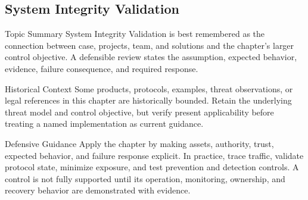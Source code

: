 \documentclass[11pt,letterpaper]{article}
\begin{document}
\subsection*{System Integrity Validation}
\begin{CornellNotesTable}
\end{CornellNotesTable}
\begin{CornellSummaryBox}{Topic Summary}
System Integrity Validation is best remembered as the connection between case, projects, team, and solutions and the chapter's larger control objective. A defensible review states the assumption, expected behavior, evidence, failure consequence, and required response.
\end{CornellSummaryBox}
\begin{CornellWarningBox}{Historical Context}
Some products, protocols, examples, threat observations, or legal references in this chapter are historically bounded. Retain the underlying threat model and control objective, but verify present applicability before treating a named implementation as current guidance.
\end{CornellWarningBox}
\begin{CornellOverviewBox}{Defensive Guidance}
Apply the chapter by making assets, authority, trust, expected behavior, and failure response explicit. In practice, trace traffic, validate protocol state, minimize exposure, and test prevention and detection controls. A control is not fully supported until its operation, monitoring, ownership, and recovery behavior are demonstrated with evidence.
\end{CornellOverviewBox}
\end{document}
